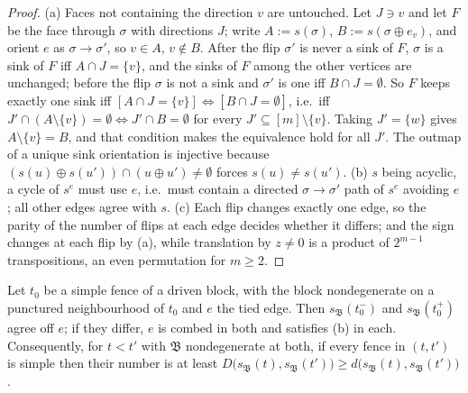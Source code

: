 \begin{proof}
(a) Faces not containing the direction $v$ are untouched. Let $J\ni v$ and let $F$ be the face
through $\sigma$ with directions $J$; write $A:=s(\sigma)$, $B:=s(\sigma\oplus e_v)$, and orient
$e$ as $\sigma\to\sigma'$, so $v\in A$, $v\notin B$. After the flip $\sigma'$ is never a sink of
$F$, $\sigma$ is a sink of $F$ iff $A\cap J=\{v\}$, and the sinks of $F$ among the other vertices
are unchanged; before the flip $\sigma$ is not a sink and $\sigma'$ is one iff $B\cap
J=\emptyset$. So $F$ keeps exactly one sink iff $[A\cap J=\{v\}]\Leftrightarrow[B\cap
J=\emptyset]$, i.e.\ iff $J'\cap(A\setminus\{v\})=\emptyset\Leftrightarrow J'\cap B=\emptyset$ for
every $J'\subseteq[m]\setminus\{v\}$. Taking $J'=\{w\}$ gives $A\setminus\{v\}=B$, and that
condition makes the equivalence hold for all $J'$. The outmap of a unique sink orientation is
injective because $(s(u)\oplus s(u'))\cap(u\oplus u')\ne\emptyset$ forces $s(u)\ne s(u')$.
(b) $s$ being acyclic, a cycle of $s^{e}$ must use $e$, i.e.\ must contain a directed
$\sigma\to\sigma'$ path of $s^{e}$ avoiding $e$; all other edges agree with $s$.
(c) Each flip changes exactly one edge, so the parity of the number of flips at each edge decides
whether it differs; and the sign changes at each flip by (a), while translation by $z\ne0$ is a
product of $2^{m-1}$ transpositions, an even permutation for $m\ge2$.
\end{proof}

\begin{theorem}\label{dl:drive-flip}
Let $t_0$ be a simple fence of a driven block, with the block nondegenerate on a punctured
neighbourhood of $t_0$ and $e$ the tied edge. Then $s_{\mathfrak B}(t_0^-)$ and
$s_{\mathfrak B}(t_0^+)$ agree off $e$; if they differ, $e$ is combed in both and satisfies
(b) in each. Consequently, for $t<t'$ with $\mathfrak B$ nondegenerate at both,
if every fence in $(t,t')$ is simple then their number is at least
$D\bigl(s_{\mathfrak B}(t),s_{\mathfrak B}(t')\bigr)\ge d\bigl(s_{\mathfrak B}(t),s_{\mathfrak
B}(t')\bigr)$.
\end{theorem}

